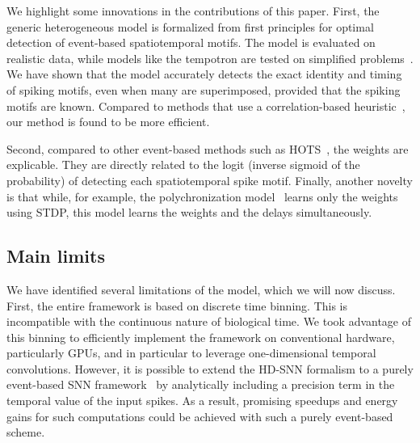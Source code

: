 \documentclass[runningheads]{llncs}
\newcommand{\ms}{\si{\milli\second}}%
\begin{document}
We highlight some innovations in the contributions of this paper. First, the generic heterogeneous model is formalized from first principles for optimal detection of event-based spatiotemporal motifs. The model is evaluated on realistic data, while models like the tempotron are tested on simplified problems~\cite{gutig_tempotron_2006}. We have shown that the model accurately detects the exact identity and timing of spiking motifs, even when many are superimposed, provided that the spiking motifs are known. Compared to methods that use a correlation-based heuristic~\cite{ghosh_spatiotemporal_2019,yu_stsc-snn_2022}, our method is found to be more efficient. 

Second, compared to other event-based methods such as HOTS~\cite{lagorce_hots_2017}, the weights are explicable. They are directly related to the logit (inverse sigmoid of the probability) of detecting each spatiotemporal spike motif. Finally, another novelty is that while, for example, the polychronization model~\cite{izhikevich_polychronization_2006} learns only the weights using STDP, this model learns the weights and the delays simultaneously.%

\subsection{Main limits}
We have identified several limitations of the model, which we will now discuss. First, the entire framework is based on discrete time binning. This is incompatible with the continuous nature of biological time. We took advantage of this binning to efficiently implement the framework on conventional hardware, particularly GPUs, and in particular to leverage one-dimensional temporal convolutions.
However, it is possible to extend the HD-SNN formalism to a purely event-based SNN framework~\cite{grimaldi_robust_2022} by analytically including a precision term in the temporal value of the input spikes. As a result, promising speedups and energy gains for such computations could be achieved with such a purely event-based scheme.
\end{document}
